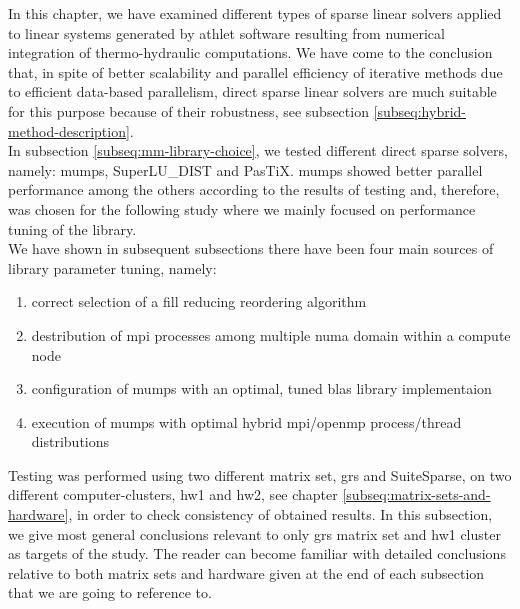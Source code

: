 \label{subseq:mm-conclusion}

In this chapter, we have examined different types of sparse linear solvers applied to linear systems generated by \acrshort{athlet} software resulting from numerical integration of thermo-hydraulic computations. We have come to the conclusion that, in spite of better scalability and parallel efficiency of iterative methods due to efficient data-based parallelism, direct sparse linear solvers are much suitable for this purpose because of their robustness, see subsection \ref{subseq:hybrid-method-description}.\\


In subsection \ref{subseq:mm-library-choice}, we tested different direct sparse solvers, namely: \acrshort{mumps},  SuperLU\_DIST and PasTiX. \acrshort{mumps} showed better parallel performance among the others according to  the results of testing and, therefore, was chosen for the following study where we mainly focused on performance tuning of the library.\\


We have shown in subsequent subsections there have been four main sources of library parameter tuning, namely:

\begin{enumerate}
	\item correct selection of a fill reducing reordering algorithm \label{conclusion:mm-1}
	\item destribution of \acrshort{mpi} processes among multiple \acrshort{numa} domain within a compute node \label{conclusion:mm-2}
	\item configuration of \acrshort{mumps} with an optimal, tuned \acrshort{blas} library implementaion \label{conclusion:mm-3}
	\item execution of \acrshort{mumps} with optimal hybrid \acrshort{mpi}/\acrshort{openmp} process/thread distributions \label{conclusion:mm-4}
\end{enumerate}


Testing was performed using two different matrix set, \acrshort{grs} and SuiteSparse, on two different computer-clusters, \gls{hw1} and \gls{hw2}, see chapter \ref{subseq:matrix-sets-and-hardware}, in order to check consistency of obtained results. In this subsection, we  give most general conclusions relevant to only \acrshort{grs} matrix set and \gls{hw1} cluster as targets of the study. The reader can become familiar with detailed conclusions relative to both matrix sets and hardware given at the end of each subsection that we are going to reference to.\\



